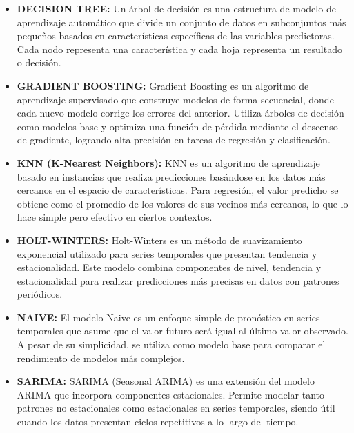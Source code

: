 \begin{itemize}
			\item \textbf{DECISION TREE: } Un árbol de decisión es una estructura de modelo de aprendizaje automático que divide un conjunto de datos en subconjuntos más pequeños basados en características específicas de las variables predictoras. Cada nodo representa una característica y cada hoja representa un resultado o decisión.
			\item \textbf{GRADIENT BOOSTING: } Gradient Boosting es un algoritmo de aprendizaje supervisado que construye modelos de forma secuencial, donde cada nuevo modelo corrige los errores del anterior. Utiliza árboles de decisión como modelos base y optimiza una función de pérdida mediante el descenso de gradiente, logrando alta precisión en tareas de regresión y clasificación.

\item \textbf{KNN (K-Nearest Neighbors): } KNN es un algoritmo de aprendizaje basado en instancias que realiza predicciones basándose en los datos más cercanos en el espacio de características. Para regresión, el valor predicho se obtiene como el promedio de los valores de sus vecinos más cercanos, lo que lo hace simple pero efectivo en ciertos contextos.

\item \textbf{HOLT-WINTERS: } Holt-Winters es un método de suavizamiento exponencial utilizado para series temporales que presentan tendencia y estacionalidad. Este modelo combina componentes de nivel, tendencia y estacionalidad para realizar predicciones más precisas en datos con patrones periódicos.

\item \textbf{NAIVE: } El modelo Naive es un enfoque simple de pronóstico en series temporales que asume que el valor futuro será igual al último valor observado. A pesar de su simplicidad, se utiliza como modelo base para comparar el rendimiento de modelos más complejos.

\item \textbf{SARIMA: } SARIMA (Seasonal ARIMA) es una extensión del modelo ARIMA que incorpora componentes estacionales. Permite modelar tanto patrones no estacionales como estacionales en series temporales, siendo útil cuando los datos presentan ciclos repetitivos a lo largo del tiempo.
		\end{itemize}
		
